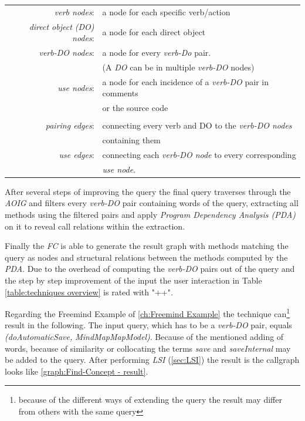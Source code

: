 \begin{table}[th]
	\begin{tabular}{r l}
		\textit{verb nodes}: & a node for each specific verb/action \\
		\textit{direct object (DO) nodes}: & a node for each direct object \\
		\textit{verb-DO nodes}: & a node for every \textit{verb-Do} pair. \\
		&(A \textit{DO} can be in multiple \textit{verb-DO} nodes) \\
		\textit{use nodes}: & a node for each incidence of a \textit{verb-DO} pair in comments \\
		& or the source code \\
		 & \\
		\textit{pairing edges}: & connecting every verb and DO to the \textit{verb-DO nodes} \\
		&containing them \\
		\textit{use edges}: & connecting each \textit{verb-DO node} to every corresponding \\
		& \textit{use node}.
	\end{tabular}
\end{table}

After several steps of improving the query the final query traverses through the \textit{AOIG} and filters every \textit{verb-DO} pair containing words of the query, extracting all methods using the filtered pairs and apply \textit{Program Dependency Analysis (PDA)} on it to reveal call relations within the extraction.

Finally the \emph{FC} is able to generate the result graph with methods matching the query as nodes and structural relations between the methods computed by the \textit{PDA}. \cite{shepherd2007using} \newline
Due to the overhead of computing the \textit{verb-DO} pairs out of the query and the step by step improvement of the input the user interaction in Table \ref{table:techniques overview} is rated with "++".

Regarding the Freemind Example of \autoref{ch:Freemind Example} the technique can\footnote{because of the different ways of extending the query the result may differ from others with the same query} result in the following. The input query, which has to be a \textit{verb-DO} pair, equals \textit{(doAutomaticSave, MindMapMapModel)}. Because of the mentioned adding of words, because of similarity or collocating the terms \textit{save} and \textit{saveInternal} may be added to the query. After performing \textit{LSI} (\autoref{sec:LSI}) the result is the callgraph looks like \autoref{graph:Find-Concept - result}.

